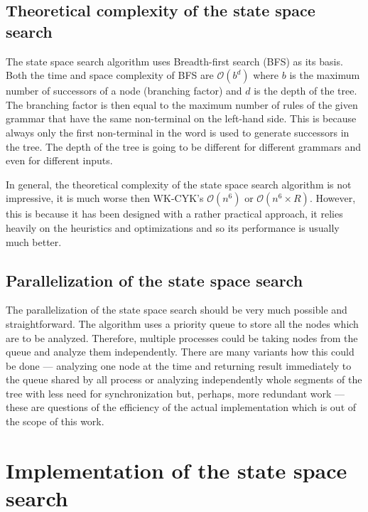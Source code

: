 \section{Theoretical complexity of the state space search}
The state space search algorithm uses Breadth-first search (BFS) as its basis. Both the time and space complexity of BFS are $\mathcal{O}(b^d)$ where $b$ is the maximum number of successors of a node (branching factor) and $d$ is the depth of the tree. The branching factor is then equal to the maximum number of rules of the given grammar that have the same non-terminal on the left-hand side. This is because always only the first non-terminal in the word is used to generate successors in the tree. The depth of the tree is going to be different for different grammars and even for different inputs.

In general, the theoretical complexity of the state space search algorithm is not impressive, it is much worse then WK-CYK's $\mathcal{O}(n^6)$ or $\mathcal{O}(n^6 \times R)$. However, this is because it has been designed with a rather practical approach, it relies heavily on the heuristics and optimizations and so its performance is usually much better.

\section{Parallelization of the state space search}
The parallelization of the state space search should be very much possible and straightforward. The algorithm uses a priority queue to store all the nodes which are to be analyzed. Therefore, multiple processes could be taking nodes from the queue and analyze them independently. There are many variants how this could be done --- analyzing one node at the time and returning result immediately to the queue shared by all process or analyzing independently whole segments of the tree with less need for synchronization but, perhaps, more redundant work --- these are questions of the efficiency of the actual implementation which is out of the scope of this work.

\chapter{Implementation of the state space search} \label{chapter:implementation}

